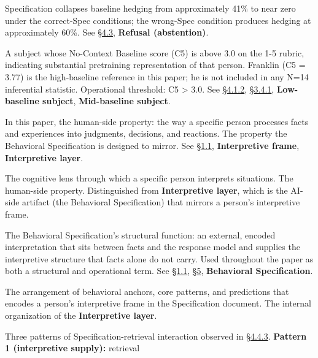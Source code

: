 \begin{description}
Specification collapses baseline hedging from approximately 41\% to near
zero under the correct-Spec conditions; the wrong-Spec condition
produces hedging at approximately 60\%. See \hyperref[mechanism-correct-content-not-format]{§4.3}, \textbf{Refusal
(abstention)}.
\item[High-baseline subject]
A subject whose No-Context Baseline score (C5) is above 3.0 on the 1-5
rubric, indicating substantial pretraining representation of that
person. Franklin (C5 = 3.77) is the high-baseline reference in this
paper; he is not included in any N=14 inferential statistic. Operational
threshold: C5 \textgreater{} 3.0. See \hyperref[the-gradient-at-the-high-baseline-end-franklin-reference]{§4.1.2}, \hyperref[pretraining-coverage-variance-high-vs-low-baseline]{§3.4.1},
\textbf{Low-baseline subject}, \textbf{Mid-baseline subject}.
\item[Interpretation]
In this paper, the human-side property: the way a specific person
processes facts and experiences into judgments, decisions, and
reactions. The property the Behavioral Specification is designed to
mirror. See \hyperref[recall-is-not-interpretation.-interpretation-can-be-measured.]{§1.1}, \textbf{Interpretive frame}, \textbf{Interpretive
layer}.
\item[Interpretive frame]
The cognitive lens through which a specific person interprets
situations. The human-side property. Distinguished from
\textbf{Interpretive layer}, which is the AI-side artifact (the
Behavioral Specification) that mirrors a person's interpretive frame.
\item[Interpretive layer]
The Behavioral Specification's structural function: an external, encoded
interpretation that sits between facts and the response model and
supplies the interpretive structure that facts alone do not carry. Used
throughout the paper as both a structural and operational term. See
\hyperref[recall-is-not-interpretation.-interpretation-can-be-measured.]{§1.1}, \hyperref[discussion]{§5}, \textbf{Behavioral Specification}.
\item[Interpretive structure]
The arrangement of behavioral anchors, core patterns, and predictions
that encodes a person's interpretive frame in the Specification
document. The internal organization of the \textbf{Interpretive layer}.
\item[Interpretive supply / over-theorization / principled refusal
(Patterns 1 / 2 / 3)]
Three patterns of Specification-retrieval interaction observed in
\hyperref[where-the-spec-helps-where-it-hurts-and-which-question-types-route-to-each]{§4.4.3}. \textbf{Pattern 1 (interpretive supply):} retrieval

\end{description}
